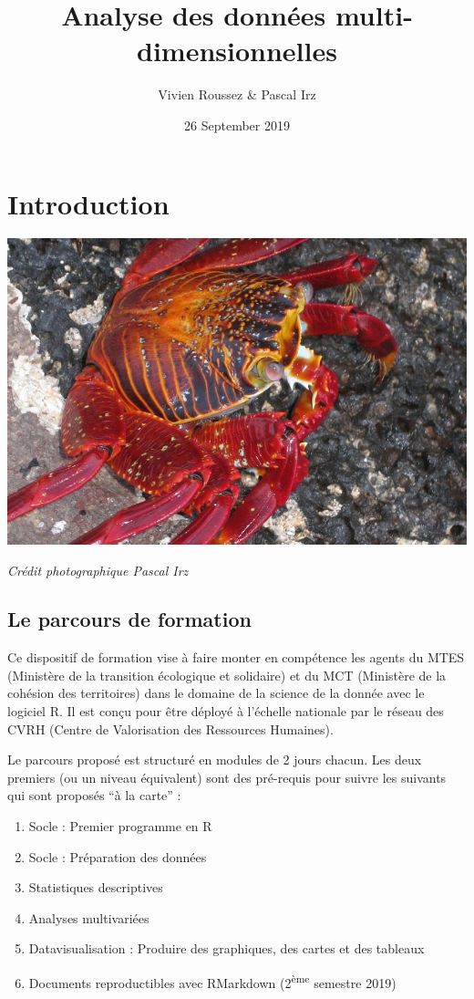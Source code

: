 \documentclass[]{book}
\title{Analyse des données multi-dimensionnelles}
\author{Vivien Roussez \& Pascal Irz}
\date{26 September 2019}
\providecommand{\tightlist}{%
  \setlength{\itemsep}{0pt}\setlength{\parskip}{0pt}}
\begin{document}
\maketitle

{
\setcounter{tocdepth}{1}
\tableofcontents
}
\hypertarget{introduction}{%
\chapter{Introduction}\label{introduction}}

\includegraphics{images/crabe.jpg}

\emph{Crédit photographique Pascal Irz}

\hypertarget{le-parcours-de-formation}{%
\section{Le parcours de formation}\label{le-parcours-de-formation}}

Ce dispositif de formation vise à faire monter en compétence les agents du MTES (Ministère de la transition écologique et solidaire) et du MCT (Ministère de la cohésion des territoires) dans le domaine de la science de la donnée avec le logiciel R. Il est conçu pour être déployé à l'échelle nationale par le réseau des CVRH (Centre de Valorisation des Ressources Humaines).

Le parcours proposé est structuré en modules de 2 jours chacun. Les deux premiers (ou un niveau équivalent) sont des pré-requis pour suivre les suivants qui sont proposés ``à la carte'' :

\begin{enumerate}
\def\labelenumi{\arabic{enumi}.}
\tightlist
\item
  Socle : Premier programme en R
\item
  Socle : Préparation des données
\item
  Statistiques descriptives
\item
  Analyses multivariées
\item
  Datavisualisation : Produire des graphiques, des cartes et des tableaux
\item
  Documents reproductibles avec RMarkdown (2\textsuperscript{ème} semestre 2019)
\end{enumerate}
\end{document}
